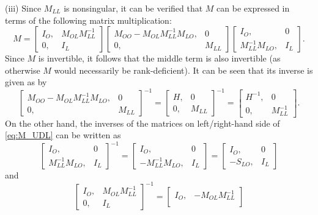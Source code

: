 \documentclass[opre,nonblindrev]{informs3} %
\begin{document}
\begin{APPENDIX}{}
(iii)
Since $M_{LL}$ is nonsingular,
it can be verified that  $M$ can be expressed  in terms of the following matrix multiplication:
\begin{equation}\label{eq:M_UDL}
M= \begin{bmatrix}
I_O, & M_{OL} M_{LL}^{-1}  \\
0,  & I_L
\end{bmatrix}
\begin{bmatrix}
M_{OO}-M_{OL}M_{LL}^{-1}M_{LO}, & 0\\
0,  & M_{LL}
\end{bmatrix}
\begin{bmatrix}
I_{O}, &  0\\
M_{LL}^{-1}M_{LO}, & I_{L}
\end{bmatrix}.
\end{equation}
Since $M$ is invertible, it follows that the middle term is also invertible (as otherwise $M$ would necessarily be rank-deficient). It can be seen that its inverse is given as by
$$
\begin{bmatrix}
M_{OO}-M_{OL}M_{LL}^{-1}M_{LO}, & 0\\
0,  & M_{LL}
\end{bmatrix}^{-1}
=
\begin{bmatrix}
H, &  0\\
0, & M_{LL}
\end{bmatrix}^{-1}
=
\begin{bmatrix}
H^{-1}, &  0\\
0, & M_{LL}^{-1}
\end{bmatrix}.
$$
On the other hand,   the inverses of the matrices on left/right-hand side of \eqref{eq:M_UDL} can be written as 
$$
\begin{bmatrix}
I_{O}, &  0\\
M_{LL}^{-1}M_{LO}, & I_{L}
\end{bmatrix}^{-1}
=
\begin{bmatrix}
I_{O}, &  0\\
-M_{LL}^{-1}M_{LO}, & I_{L}
\end{bmatrix}
=
\begin{bmatrix}
I_{O}, &  0\\
-S_{LO}, & I_{L}
\end{bmatrix}
$$ and
$$
\begin{bmatrix}
I_O, & M_{OL} M_{LL}^{-1}  \\
0 ,  & I_L
\end{bmatrix}^{-1}
=
\begin{bmatrix}
I_O, & -M_{OL} M_{LL}^{-1}  \\

\end{bmatrix}$$
\end{APPENDIX}
\end{document}
